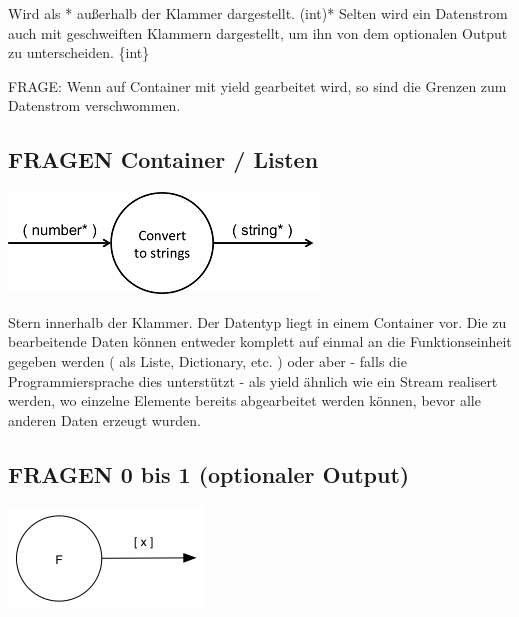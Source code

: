\documentclass[11pt]{article}
\begin{document}
Wird als * außerhalb der Klammer dargestellt.
(int)*
Selten wird ein Datenstrom auch mit geschweiften Klammern dargestellt, um ihn von dem optionalen Output zu unterscheiden.
\{int\}

FRAGE: Wenn auf Container mit yield gearbeitet wird, so sind die Grenzen zum
Datenstrom verschwommen.
\subsection{{\bfseries\sffamily FRAGEN} Container / Listen}
\label{sec:orgheadline24}

\includegraphics[width=.9\linewidth]{./img/diagramCollection.png}

Stern innerhalb der Klammer.
Der Datentyp liegt in einem Container vor. 
Die zu bearbeitende Daten können entweder komplett auf einmal an die Funktionseinheit gegeben werden ( als Liste, Dictionary, etc. )
oder aber - falls die Programmiersprache dies unterstützt - als yield ähnlich
wie ein Stream realisert werden, wo einzelne Elemente bereits abgearbeitet werden
können, bevor alle anderen Daten erzeugt wurden.

\subsection{{\bfseries\sffamily FRAGEN} 0 bis 1 (optionaler Output)}
\label{sec:orgheadline25}

\includegraphics[width=.9\linewidth]{./img/diagramOptional.png}
\end{document}
